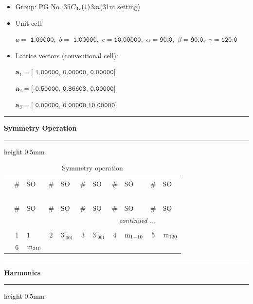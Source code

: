 \documentclass[fleqn,10pt,landscape]{jsarticle}
\begin{document}
\begin{itemize}
\item Group: PG No. 35\quad$C_{\rm 3v}(1)$\quad$3m$\quad(31m setting)\quad[ trigonal ]
\end{itemize}
\begin{itemize}
\item Unit cell:

\quad $a=\texttt{ 1.00000},\,\, b=\texttt{ 1.00000},\,\, c=\texttt{10.00000},\,\, \alpha=\texttt{90.0},\,\, \beta=\texttt{90.0},\,\, \gamma=\texttt{120.0}$

\item Lattice vectors (conventional cell):

\quad $\bm{a}_1=\texttt{[ 1.00000, 0.00000, 0.00000]}$

\quad $\bm{a}_2=\texttt{[-0.50000, 0.86603, 0.00000]}$

\quad $\bm{a}_3=\texttt{[ 0.00000, 0.00000,10.00000]}$

\end{itemize}
\vspace{5mm}
\noindent \rule[0.5mm]{5mm}{0.5mm}\hspace{3mm}\textbf{Symmetry Operation}\hspace{3mm}\leaders\hrule height 0.5mm\hfill\kern0pt
\vspace{3mm}

\renewcommand{\arraystretch}{1.6}
\begin{longtable}[l]{c|cl|cl|cl|cl|cl}
\captionsetup{justification=raggedright, singlelinecheck=off}
\caption{Symmetry operation}
 \\
 \hline \hline
 & \# & SO & \# & SO & \# & SO & \# & SO & \# & SO \\ \hline \endfirsthead

\multicolumn{10}{l}{\tablename\ \thetable{}} \\
 \hline \hline
 & \# & SO & \# & SO & \# & SO & \# & SO & \# & SO \\ \hline \endhead

 \hline \hline
\multicolumn{10}{r}{\footnotesize\it continued ...} \\ \endfoot

 \hline \hline
\multicolumn{10}{r}{} \\ \endlastfoot

 & 1 & $1$ & 2 & $3^{+}_{\,\,001}$ & 3 & $3^{-}_{\,\,001}$ & 4 & ${\rm m}_{1-10}$ & 5 & ${\rm m}_{120}$ \\
& 6 & ${\rm m}_{210}$ &  &  &  &  &  &  &  &  \\
\end{longtable}
\vspace{5mm}
\noindent \rule[0.5mm]{5mm}{0.5mm}\hspace{3mm}\textbf{Harmonics}\hspace{3mm}\leaders\hrule height 0.5mm\hfill\kern0pt
\vspace{3mm}
\end{document}
